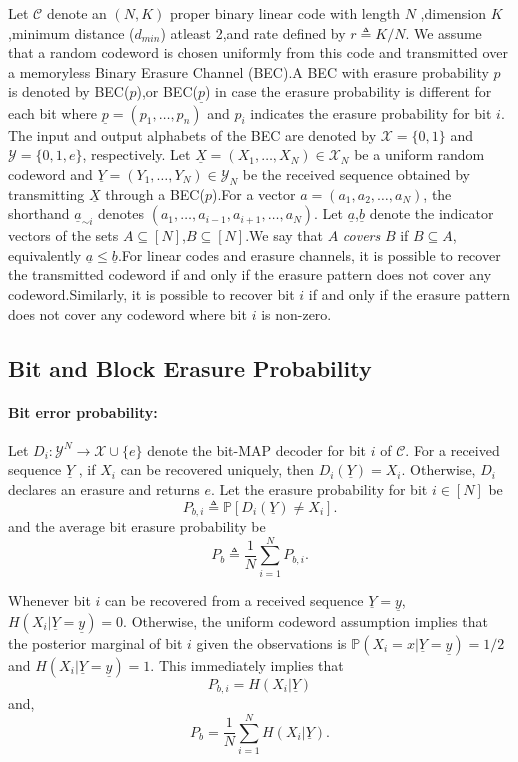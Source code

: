 \documentclass[
10pt, %
a4paper, %
oneside, %
headinclude,footinclude, %
BCOR5mm, %
]{scrartcl}
\begin{document}
Let $\mathcal{C}$ denote an $(N, K)$ proper binary linear code with length $N$ ,dimension $K$ ,minimum distance ($d_{min}$) atleast 2,and rate defined by $r \triangleq K/N$. We assume that a random codeword is chosen uniformly from this code and transmitted over a memoryless Binary Erasure Channel (BEC).A BEC with erasure probability $p$ is denoted by BEC($p$),or BEC($\underline{p}$) in case the erasure probability is different for each bit where $\underline{p} = (p_1 , \ldots , p_n)$ and
$p_i$ indicates the erasure probability for bit $i$.
The input and output alphabets of the BEC are denoted by $\mathcal{X} = \{0, 1\}$ and $\mathcal{Y} = \{0, 1, e\}$, respectively. Let $\underline{X} = (X_1 , \ldots , X_N) \in \mathcal{X}_N$ be a uniform random codeword and
$\underline{Y} = (Y_1 , \ldots, Y_N) \in \mathcal{Y}_N$ be the received sequence obtained by transmitting $\underline{X}$ through a BEC($p$).For a vector $a = (a_1 , a_2 , \ldots , a_N)$, the shorthand $\underline{a}_{\sim i}$ denotes
$(a_1 , \ldots , a_{i-1} , a_{i+1}, \ldots , a_N)$.
Let $\underline{a}$,$\underline{b}$ denote the indicator vectors of the sets $A \subseteq [N]$,$B \subseteq [N]$.We say that $A$ \emph{covers} $B$ if $B \subseteq A$, equivalently  $\underline{a}\leq\underline{b}$.For linear codes and erasure channels, it is possible to recover the transmitted codeword if and only if the erasure
pattern does not cover any codeword.Similarly,
it is possible to recover bit $i$ if and only if the erasure
pattern does not cover any codeword where bit $i$ is non-zero.


\subsection*{Bit and Block Erasure Probability} 
\paragraph*{Bit error probability:}Let $D_i : \mathcal{Y}^N \to \mathcal{X} \cup \{e\}$ denote the bit-MAP decoder for bit $i$ of $\mathcal{C}$. For a received sequence $\underline{Y}$ , if $X_i$ can be recovered uniquely, then $D_i(\underline{Y}) = X_i$. Otherwise, $D_i$ declares an erasure and returns $e$. Let the erasure probability for bit $i \in [N]$ be $$P_{b,i} \triangleq \mathbb{P}[D_i(\underline{Y}) \neq X_i].$$ and the average bit erasure probability be $$P_b \triangleq \frac{1}{N}\sum_{i=1}^N P_{b,i}.$$

Whenever bit $i$ can be recovered from a received sequence $\underline{Y}=\underline{y}$, $H(X_i | \underline{Y}=\underline{y}) = 0$. Otherwise, the uniform codeword assumption implies that the posterior marginal of bit $i$ given the observations is $\mathbb{P}(X_i = x|\underline{Y}=\underline{y}) = 1/2$ and $H(X_i |\underline{Y}=\underline{y}) = 1$. This immediately implies that $$P_{b,i} = H(X_i|\underline{Y})$$ and, $$P_b = \frac{1}{N}\sum_{i=1}^N  H(X_i|\underline{Y}).$$
\end{document}
